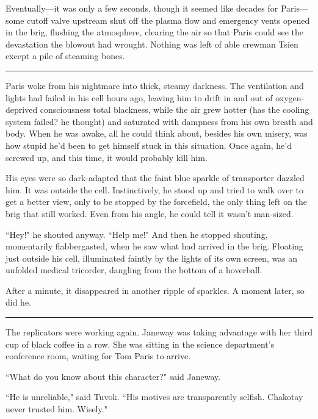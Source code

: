 \documentclass[twoside,letterpaper,12pt]{memoir}
\begin{document}
Eventually---it was only a few seconds, though it seemed like decades for Paris---some cutoff valve upstream shut off the plasma flow and emergency vents opened in the brig, flushing the atmosphere, clearing the air so that Paris could see the devastation the blowout had wrought. Nothing was left of able crewman Tsien except a pile of steaming bones.

\begin{center}\rule{3cm}{0.4 pt}\end{center}

Paris woke from his nightmare into thick, steamy darkness. The ventilation and lights had failed in his cell hours ago, leaving him to drift in and out of oxygen-deprived consciousness total blackness, while the air grew hotter (has the cooling system failed? he thought) and saturated with dampness from his own breath and body. When he was awake, all he could think about, besides his own misery, was how stupid he'd been to get himself stuck in this situation. Once again, he'd screwed up, and this time, it would probably kill him.

His eyes were so dark-adapted that the faint blue sparkle of transporter dazzled him. It was outside the cell. Instinctively, he stood up and tried to walk over to get a better view, only to be stopped by the forcefield, the only thing left on the brig that still worked. Even from his angle, he could tell it wasn't man-sized.

``Hey!" he shouted anyway. ``Help me!" And then he stopped shouting, momentarily flabbergasted, when he saw what had arrived in the brig. Floating just outside his cell, illuminated faintly by the lights of its own screen, was an unfolded medical tricorder, dangling from the bottom of a hoverball.

After a minute, it disappeared in another ripple of sparkles. A moment later, so did he.

\begin{center}\rule{3cm}{0.4 pt}\end{center}

The replicators were working again. Janeway was taking advantage with her third cup of black coffee in a row. She was sitting in the science department's conference room, waiting for Tom Paris to arrive.

``What do you know about this character?" said Janeway.

``He is unreliable," said Tuvok. ``His motives are transparently selfish. Chakotay never trusted him. Wisely."
\end{document}

